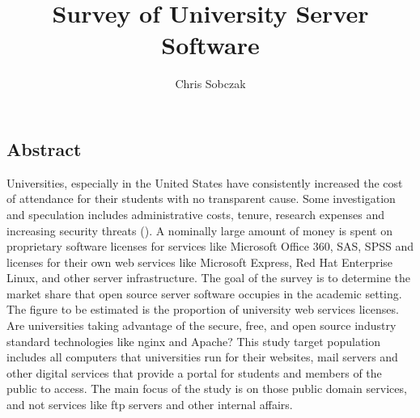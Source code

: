\documentclass{article}
\author{Chris Sobczak}
\title{Survey of University Server Software}
\theoremstyle{definition}
\begin{document}
\begin{titlepage}
\maketitle

\vspace*{\fill}

\section{Abstract}
Universities, especially in the United States have consistently
increased the cost of attendance for their students with
no transparent cause. Some investigation and speculation
includes administrative costs, tenure, research expenses
and increasing security threats (\cite{ronald2009}).
A nominally large amount of money is spent on proprietary
software licenses for services like Microsoft Office 360,
SAS, SPSS and licenses for their own web services like
Microsoft Express, Red Hat Enterprise Linux, and other
server infrastructure.
The goal of the survey is to determine the market share
that open source server software occupies in the academic
setting.
The
figure to be estimated is the proportion of university web
services licenses. Are universities taking advantage of
the secure, free, and open source industry standard technologies
like nginx and Apache?
This study target population includes
all computers that
universities run for their websites, mail servers and other
digital services that provide a portal for students and
members of the public to access. The main focus of the study
is on those public domain services, and not services like
ftp servers and other internal affairs.

\end{titlepage}
\end{document}
